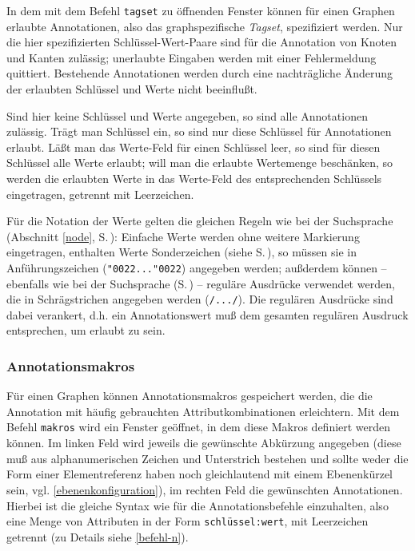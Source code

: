 \documentclass[12pt]{scrartcl}
\newcommand{\quo}{\char"0022}
\begin{document}
In dem mit dem Befehl \texttt{tagset} zu öffnenden Fenster können für einen Graphen erlaubte Annotationen, also das graphspezifische \textit{Tagset}, spezifiziert werden. Nur die hier spezifizierten Schlüssel-Wert-Paare sind für die Annotation von Knoten und Kanten zulässig; unerlaubte Eingaben werden mit einer Fehlermeldung quittiert. Bestehende Annotationen werden durch eine nachträgliche Änderung der erlaubten Schlüssel und Werte nicht beeinflußt.

Sind hier keine Schlüssel und Werte angegeben, so sind alle Annotationen zulässig. Trägt man Schlüssel ein, so sind nur diese Schlüssel für Annotationen erlaubt. Läßt man das Werte-Feld für einen Schlüssel leer, so sind für diesen Schlüssel alle Werte erlaubt; will man die erlaubte Wertemenge beschänken, so werden die erlaubten Werte in das Werte-Feld des entsprechenden Schlüssels eingetragen, getrennt mit Leerzeichen.

Für die Notation der Werte gelten die gleichen Regeln wie bei der Suchsprache (Abschnitt \ref{node}, S.\,\pageref{zeichenketten}): Einfache Werte werden ohne weitere Markierung eingetragen, enthalten Werte Sonderzeichen (siehe S.\,\pageref{zeichenketten}), so müssen sie in Anführungszeichen (\texttt{\quo...\quo}) angegeben werden; außderdem können – ebenfalls wie bei der Suchsprache (S.\,\pageref{zeichenketten}) – reguläre Ausdrücke verwendet werden, die in Schrägstrichen angegeben werden (\texttt{/.../}). Die regulären Ausdrücke sind dabei verankert, d.h. ein Annotationswert muß dem gesamten regulären Ausdruck entsprechen, um erlaubt zu sein.

\subsubsection{Annotationsmakros}\label{annotationsmakros}

Für einen Graphen können Annotationsmakros gespeichert werden, die die Annotation mit häufig gebrauchten Attributkombinationen erleichtern. Mit dem Befehl \texttt{makros} wird ein Fenster geöffnet, in dem diese Makros definiert werden können. Im linken Feld wird jeweils die gewünschte Abkürzung angegeben (diese muß aus alphanumerischen Zeichen und Unterstrich bestehen und sollte weder die Form einer Elementreferenz haben noch gleichlautend mit einem Ebenenkürzel sein, vgl. \ref{ebenenkonfiguration}), im rechten Feld die gewünschten Annotationen. Hierbei ist die gleiche Syntax wie für die Annotationsbefehle einzuhalten, also eine Menge von Attributen in der Form \texttt{schlüssel:wert}, mit Leerzeichen getrennt (zu Details siehe \ref{befehl-n}).
\end{document}
